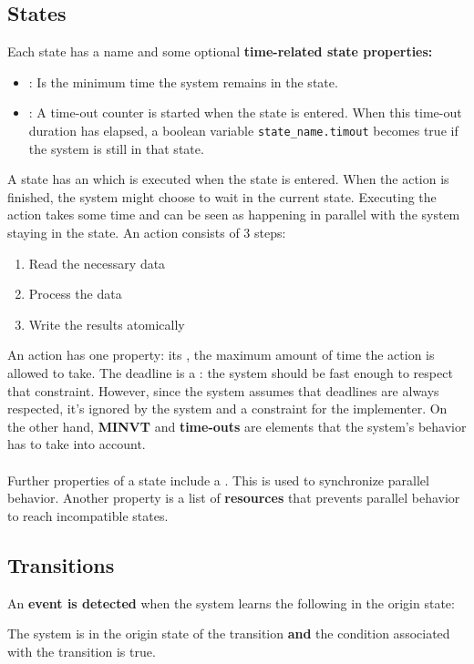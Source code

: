 \documentclass[../main.tex]{subfiles}
\begin{document}
\subsection{States}
Each state has a name and some optional \textbf{time-related state properties:}
\begin{itemize}
	\item {}: Is the minimum time the system remains in the state.
	\item {}: A time-out counter is started when the state is entered. When this time-out duration has elapsed, a boolean variable \texttt{state\_name.timout} becomes true if the system is still in that state.
\end{itemize}

A state has an  which is executed when the state is entered.
When the action is finished, the system might choose to wait in the current state.
Executing the action takes some time and can be seen as happening in parallel with the system staying in the state.
An action consists of 3 steps:
\begin{enumerate}
	\item Read the necessary data
	\item Process the data
	\item Write the results atomically
\end{enumerate}
An action has one property: its , the maximum amount of time the action is allowed to take.
The deadline is a : the system should be fast enough to respect that constraint.
However, since the system assumes that deadlines are always respected, it's ignored by the system and a constraint for the implementer.
On the other hand, \textbf{MINVT} and \textbf{time-outs} are elements that the system's behavior has to take into account.
\\\\
Further properties of a state include a .
This is used to synchronize parallel behavior.
Another property is a list of \textbf{resources} that  prevents parallel behavior to reach incompatible states.

\subsection{Transitions}
\begin{defn}
An \textbf{event is detected} when the system learns the following in the origin state:
\begin{center}
The system is in the origin state of the transition \textbf{and} the condition associated with the transition is true.
\end{center}
\end{defn}
\end{document}
